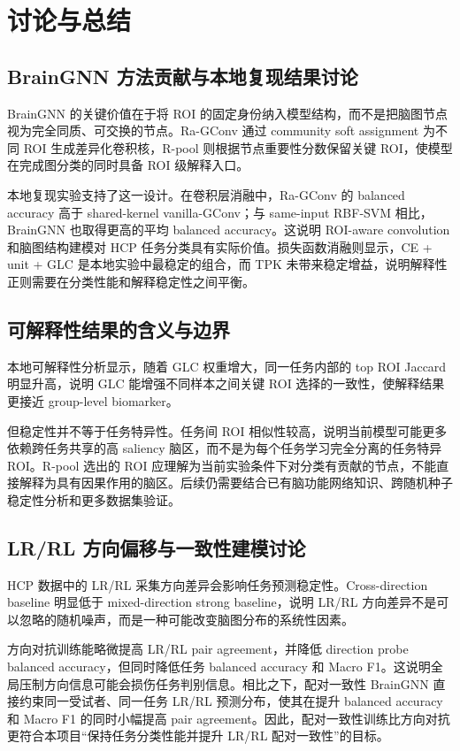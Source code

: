 \chapter{讨论与总结}

\section{BrainGNN 方法贡献与本地复现结果讨论}

BrainGNN 的关键价值在于将 ROI 的固定身份纳入模型结构，而不是把脑图节点视为完全同质、可交换的节点。Ra-GConv 通过 community soft assignment 为不同 ROI 生成差异化卷积核，R-pool 则根据节点重要性分数保留关键 ROI，使模型在完成图分类的同时具备 ROI 级解释入口。

本地复现实验支持了这一设计。在卷积层消融中，Ra-GConv 的 balanced accuracy 高于 shared-kernel vanilla-GConv；与 same-input RBF-SVM 相比，BrainGNN 也取得更高的平均 balanced accuracy。这说明 ROI-aware convolution 和脑图结构建模对 HCP 任务分类具有实际价值。损失函数消融则显示，CE + unit + GLC 是本地实验中最稳定的组合，而 TPK 未带来稳定增益，说明解释性正则需要在分类性能和解释稳定性之间平衡。

\section{可解释性结果的含义与边界}

本地可解释性分析显示，随着 GLC 权重增大，同一任务内部的 top ROI Jaccard 明显升高，说明 GLC 能增强不同样本之间关键 ROI 选择的一致性，使解释结果更接近 group-level biomarker。

但稳定性并不等于任务特异性。任务间 ROI 相似性较高，说明当前模型可能更多依赖跨任务共享的高 saliency 脑区，而不是为每个任务学习完全分离的任务特异 ROI。R-pool 选出的 ROI 应理解为当前实验条件下对分类有贡献的节点，不能直接解释为具有因果作用的脑区。后续仍需要结合已有脑功能网络知识、跨随机种子稳定性分析和更多数据集验证。

\section{LR/RL 方向偏移与一致性建模讨论}

HCP 数据中的 LR/RL 采集方向差异会影响任务预测稳定性。Cross-direction baseline 明显低于 mixed-direction strong baseline，说明 LR/RL 方向差异不是可以忽略的随机噪声，而是一种可能改变脑图分布的系统性因素。

方向对抗训练能略微提高 LR/RL pair agreement，并降低 direction probe balanced accuracy，但同时降低任务 balanced accuracy 和 Macro F1。这说明全局压制方向信息可能会损伤任务判别信息。相比之下，配对一致性 BrainGNN 直接约束同一受试者、同一任务 LR/RL 预测分布，使其在提升 balanced accuracy 和 Macro F1 的同时小幅提高 pair agreement。因此，配对一致性训练比方向对抗更符合本项目“保持任务分类性能并提升 LR/RL 配对一致性”的目标。

